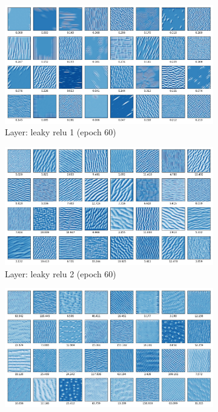 \documentclass[12pt,a4paper]{extarticle}
\begin{document}
\begin{enumerate}
\begin{enumerate}
    \begin{figure}[H]
      \begin{subfigure}[t]{0.5\textwidth}
        \centering
        \includegraphics[width=\linewidth]{images/weak_leaky_re_lu_1_e60.png}
        \caption{Layer: leaky relu 1 (epoch 60)}
        \label{fig:weak_leaky_relu_1_e60}
      \end{subfigure}
      \begin{subfigure}[t]{0.5\textwidth}
        \centering
        \includegraphics[width=\linewidth]{images/weak_leaky_re_lu_2_e60.png}
        \caption{Layer: leaky relu 2 (epoch 60)}
        \label{fig:weak_leaky_relu_2_e60}
      \end{subfigure}
      \begin{subfigure}[t]{0.5\textwidth}
        \centering
        \includegraphics[width=\linewidth]{images/weak_leaky_re_lu_3_e60.png}

\end{subfigure}
\end{figure}
\end{enumerate}
\end{enumerate}
\end{document}
